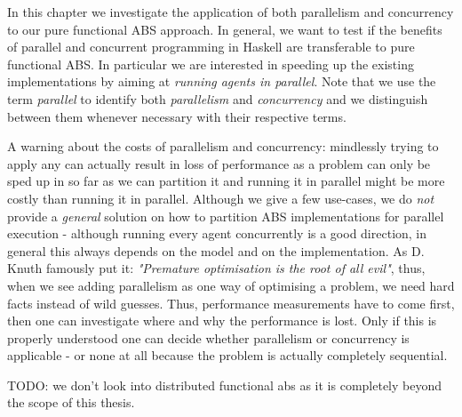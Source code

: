 In this chapter we investigate the application of both parallelism and concurrency to our pure functional ABS approach. In general, we want to test if the benefits of parallel and concurrent programming in Haskell are transferable to pure functional ABS. In particular we are interested in speeding up the existing implementations by aiming at \textit{running agents in parallel}. Note that we use the term \textit{parallel} to identify both \textit{parallelism} and \textit{concurrency} and we distinguish between them whenever necessary with their respective terms.

A warning about the costs of parallelism and concurrency: mindlessly trying to apply any can actually result in loss of performance as a problem can only be sped up in so far as we can partition it and running it in parallel might be more costly than running it in parallel. Although we give a few use-cases, we do \textit{not} provide a \textit{general} solution on how to partition ABS implementations for parallel execution - although running every agent concurrently is a good direction, in general this always depends on the model and on the implementation. As D. Knuth famously put it: \textit{"Premature optimisation is the root of all evil"}, thus, when we see adding parallelism as one way of optimising a problem, we need hard facts instead of wild guesses. Thus, performance measurements have to come first, then one can investigate where and why the performance is lost. Only if this is properly understood one can decide whether parallelism or concurrency is applicable - or none at all because the problem is actually completely sequential.

TODO: we don't look into distributed functional abs as it is completely beyond the scope of this thesis.





